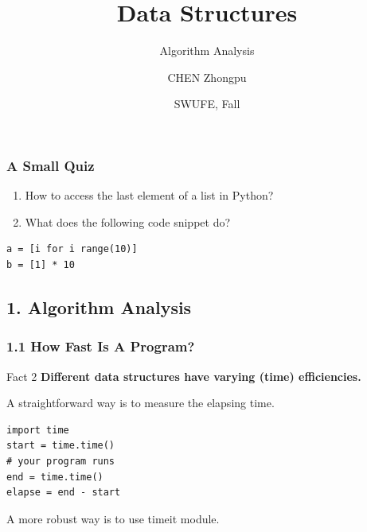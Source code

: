 \documentclass[aspectratio=169, 14pt]{beamer}
\title[Data Structures] %
{Data Structures}
\subtitle{Algorithm Analysis}
\author[CHEN Zhongpu] %
{CHEN Zhongpu}
\institute[] %
{
	School of Computing and Artificial Intelligence \\
	\href{mailto:zpchen@swufe.edu.cn}{zpchen@swufe.edu.cn}
}
\date[] %
{SWUFE, Fall \the\year{}}
\begin{document}
\frame{\titlepage}

\begin{frame}[fragile]
	\frametitle{A Small Quiz}
	\begin{enumerate}
		\item How to access the last element of a \alert{list} in Python?
		\item What does the following code snippet do?
	\end{enumerate}

	\begin{verbatim}
a = [i for i range(10)]
b = [1] * 10
    \end{verbatim}
\end{frame}

{
\begin{frame}
	\section{\textcolor{darkmidnightblue}{1. Algorithm Analysis}}
\end{frame}
}

\begin{frame}[fragile]
	\frametitle{1.1 How Fast Is A Program?}
	\begin{block}{Fact 2}
		\textbf{Different data structures have varying (time) \alert{efficiencies}.}
	\end{block}
	\faClock A straightforward way is to measure the elapsing time.
	\begin{verbatim}
import time
start = time.time()
# your program runs
end = time.time()
elapse = end - start
\end{verbatim}
	A more robust way is to use \alert{timeit} module.
\end{frame}
\end{document}
